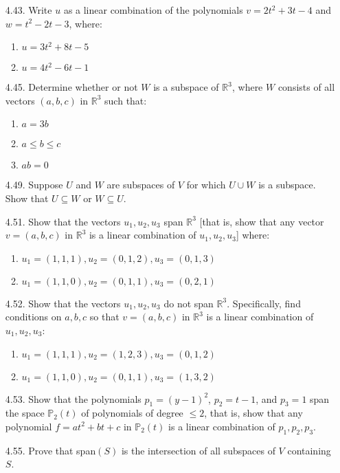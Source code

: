 \documentclass[12pt]{article}
\begin{document}
\begin{enumerate}
\item[4.43.] Write $u$ as a linear combination of the polynomials $v=2t^2+3t-4$ and $w=t^2-2t-3$, where:
	\begin{enumerate}
	\item $u=3t^2+8t-5$

	\item $u=4t^2-6t-1$
	\end{enumerate}
	
\item[4.45.] Determine whether or not $W$ is a subspace of $\mathbb{R}^3$, where $W$ consists of all vectors $(a,b,c)$ in $\mathbb{R}^3$ such that:
	\begin{enumerate}
	\item $a=3b$

	\item $a \leq b \leq c$

	\item $ab=0$
	\end{enumerate}

\item[4.49.] Suppose $U$ and $W$ are subspaces of $V$ for which $U \cup W$ is a subspace. Show that $U \subseteq W$ or $W \subseteq U$.

\item[4.51.] Show that the vectors $u_1,u_2,u_3$ span $\mathbb{R}^3$ [that is, show that any vector $v=(a,b,c)$ in $\mathbb{R}^3$ is a linear combination of $u_1,u_2,u_3$] where:
	\begin{enumerate}
	\item $u_1=(1,1,1),u_2=(0,1,2),u_3=(0,1,3)$
	
	\item $u_1=(1,1,0),u_2=(0,1,1),u_3=(0,2,1)$
	\end{enumerate}
	
\item[4.52.] Show that the vectors $u_1,u_2,u_3$ do not span $\mathbb{R}^3$. Specifically, find conditions on $a,b,c$ so that $v=(a,b,c)$ in $\mathbb{R}^3$ is a linear combination of $u_1,u_2,u_3$:
	\begin{enumerate}
	\item $u_1=(1,1,1),u_2=(1,2,3),u_3=(0,1,2)$
	
	\item $u_1=(1,1,0),u_2=(0,1,1),u_3=(1,3,2)$
	\end{enumerate}

\item[4.53.] Show that the polynomials $p_1=(y-1)^2$, $p_2=t-1$, and $p_3=1$ span the space $\mathbb{P}_2(t)$ of polynomials of degree $\leq 2$, that is, show that any polynomial $f=at^2+bt+c$ in $\mathbb{P}_2(t)$ is a linear combination of $p_1,p_2,p_3$.

\item[4.55.] Prove that span$(S)$ is the intersection of all subspaces of $V$ containing $S$.


\end{enumerate}
\end{document}
